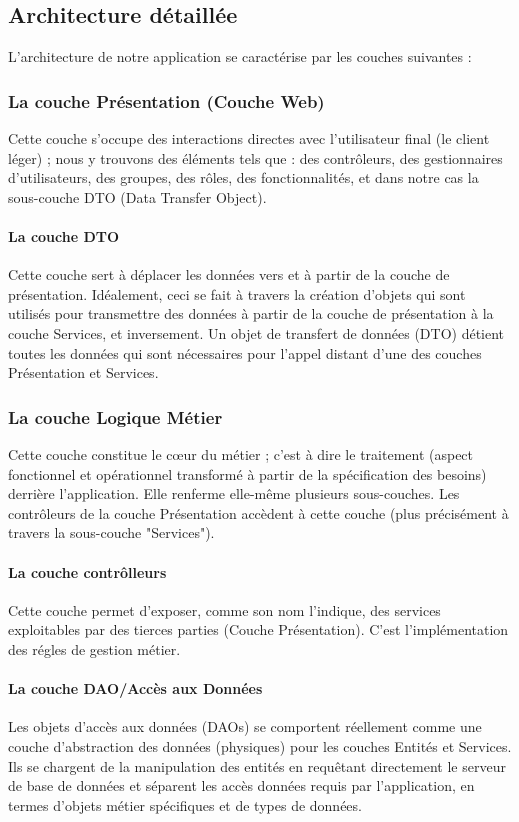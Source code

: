 \subsection{Architecture d\'etaill\'ee}

L'architecture de notre application se caract\'erise par les couches suivantes :
\subsubsection*{La couche Pr\'esentation (Couche Web)}
Cette couche s'occupe des interactions directes avec l'utilisateur final (le client l\'eger) ; nous y trouvons des \'el\'ements tels que : des contr\^oleurs, des gestionnaires d'utilisateurs, des groupes, des r\^oles, des fonctionnalit\'es, et dans
notre cas la sous-couche DTO (Data Transfer Object).
\paragraph{La couche DTO}
Cette couche sert \`a d\'eplacer les donn\'ees vers et à partir de la couche de pr\'esentation. Id\'ealement, ceci se fait \`a travers la cr\'eation d'objets qui sont utilis\'es pour transmettre des donn\'ees \`a partir de la couche de pr\'esentation \`a la couche Services, et inversement. Un objet de transfert de donn\'ees (DTO) d\'etient toutes les donn\'ees qui sont nécessaires pour l'appel distant d'une des couches Présentation et Services.

\subsubsection*{La couche Logique M\'etier}
Cette couche constitue le c\oe ur du m\'etier ; c'est \`a dire le traitement (aspect fonctionnel et op\'erationnel transform\'e \`a partir de la sp\'ecification des besoins) derri\`ere l'application. Elle renferme elle-même plusieurs sous-couches. Les
contr\^oleurs de la couche Pr\'esentation acc\`edent \`a cette couche (plus pr\'ecis\'ement \`a travers la sous-couche "Services").
\paragraph{La couche contrôlleurs}
Cette couche permet d'exposer, comme son nom l'indique, des services exploitables par des tierces parties (Couche Pr\'esentation). C'est l'impl\'ementation des r\'egles de gestion m\'etier.
\paragraph{La couche DAO/Acc\`es aux Donn\'ees}
Les objets d'acc\`es aux donn\'ees (DAOs) se comportent r\'eellement comme une couche d'abstraction des donn\'ees (physiques)
pour les couches Entit\'es et Services. Ils se chargent de la manipulation des entit\'es en requ\^etant directement le serveur de base de donn\'ees et s\'eparent les acc\`es donn\'ees requis par l'application, en termes d'objets m\'etier sp\'ecifiques et de types de donn\'ees.
